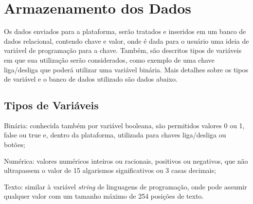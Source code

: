         \begin{figure}[!h]
    	\end{figure}

    \section{Armazenamento dos Dados}
    \label{sec:armazenamento-dados}
    
    Os dados enviados para a plataforma, serão tratados e inseridos em um banco de dados relacional, contendo chave e valor, onde é dada para o usuário uma ideia de variável de programação para a chave. Também, são descritos tipos de variáveis em que sua utilização serão considerados, como exemplo de uma chave liga/desliga que poderá utilizar uma variável binária. Mais detalhes sobre os tipos de variável e o banco de dados utilizado são dados abaixo.
    
        \subsection{Tipos de Variáveis}
        \label{sec:tipos-variaveis}
            
        \begin{alineascomponto}
            \item Binária: conhecida também por variável booleana, são permitidos valores 0 ou 1, false ou true e, dentro da plataforma, utilizada para chaves liga/desliga ou botões;
            \item Numérica: valores numéricos inteiros ou racionais, positivos ou negativos, que não ultrapassem o valor de 15 algarismos significativos ou 3 casas decimais;
            \item Texto: similar à variável \textit{string} de linguagens de programação, onde pode assumir qualquer valor com um tamanho máximo de 254 posições de texto.
        \end{alineascomponto}
        
